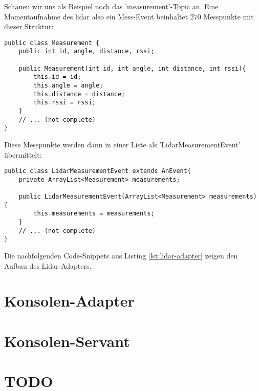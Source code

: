 Schauen wir uns als Beispiel noch das 'measurement'-Topic an. Eine Momentaufnahme des \acrshort{lidar} also ein Mess-Event beinhaltet 270 Messpunkte mit dieser Struktur:
\begin{lstlisting}[caption={Lidar-Adapter - Struktur der Messpunkte},label={lst:lidar_measurement}]
public class Measurement {
	public int id, angle, distance, rssi;
	
	public Measurement(int id, int angle, int distance, int rssi){
		this.id = id;
		this.angle = angle;
		this.distance = distance;
		this.rssi = rssi;
	}
	// ... (not complete)
}
\end{lstlisting}
Diese Messpunkte werden dann in einer Liste als 'LidarMeasurementEvent' übermittelt:
\begin{lstlisting}[caption={Lidar-Adapter - Struktur des 'LidarMeasurementEvent'},label={lst:lidar_measurementevent}]
public class LidarMeasurementEvent extends AnEvent{
	private ArrayList<Measurement> measurements;
	
	public LidarMeasurementEvent(ArrayList<Measurement> measurements) {
		this.measurements = measurements;
	}
	// ... (not complete)
}
\end{lstlisting}

Die nachfolgenden Code-Snippets aus Listing \ref{lst:lidar-adapter} zeigen den Aufbau des Lidar-Adapters.



\section{Konsolen-Adapter}

\section{Konsolen-Servant}

\section{TODO}

